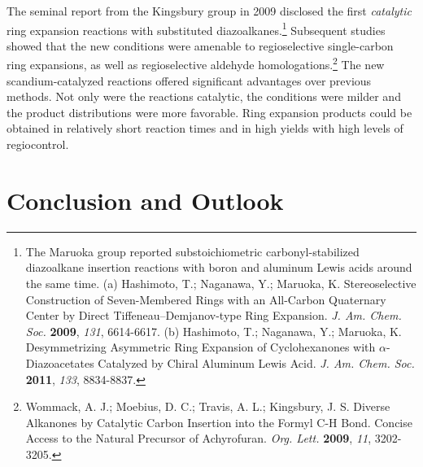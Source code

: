 The seminal report from the Kingsbury group in 2009 disclosed the first
\textit{catalytic} ring expansion reactions with substituted diazoalkanes.\footnote{The Maruoka
group reported substoichiometric carbonyl-stabilized diazoalkane insertion reactions with boron and
aluminum Lewis acids around the same time. (a) {\frenchspacing Hashimoto, T.; Naganawa, Y.; Maruoka,
K.
Stereoselective Construction of Seven-Membered Rings with an All-Carbon Quaternary Center by Direct
Tiffeneau--Demjanov-type Ring Expansion. \textit{J. Am. Chem. Soc.} \textbf{2009}, \textit{131},
6614-6617.} (b) {\frenchspacing Hashimoto, T.; Naganawa, Y.; Maruoka, K. Desymmetrizing Asymmetric
Ring Expansion of Cyclohexanones with $\alpha$-Diazoacetates Catalyzed by Chiral Aluminum Lewis
Acid. \textit{J. Am. Chem. Soc.} \textbf{2011}, \textit{133}, 8834-8837.}} Subsequent studies
showed that the new conditions were amenable to regioselective single-carbon ring expansions, as
well as regioselective aldehyde homologations.\footnote{{\frenchspacing Wommack, A. J.; Moebius, D.
C.; Travis, A. L.; Kingsbury, J. S. Diverse Alkanones by Catalytic Carbon Insertion into the Formyl
C-H Bond. Concise Access to the Natural Precursor of Achyrofuran. \textit{Org. Lett.} \textbf{2009},
\textit{11}, 3202-3205.}} The new scandium-catalyzed reactions offered significant advantages over previous methods.
Not only were the reactions catalytic, the conditions were milder and the product distributions were more favorable. Ring expansion products could be obtained in relatively short reaction
times and in high yields with high levels of regiocontrol. 

\pagebreak

\section{Conclusion and Outlook}

